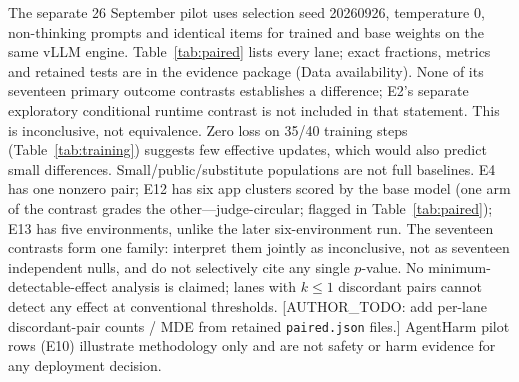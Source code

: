 \documentclass[a4paper,runningheads]{llncs}
\begin{document}
The separate 26 September pilot uses selection seed 20260926, temperature 0,
non-thinking prompts and identical items for trained and base weights on the
same vLLM engine. Table~\ref{tab:paired} lists every lane; exact fractions,
metrics and retained tests are in the evidence package (Data
availability). None of its seventeen
primary outcome contrasts establishes a difference; E2's separate exploratory
conditional runtime contrast is not included in that statement. This is inconclusive,
not equivalence. Zero loss on 35/40 training steps (Table~\ref{tab:training})
suggests few effective updates, which would also predict small differences. Small/public/substitute populations are not full baselines.
E4 has one nonzero pair; E12 has six app clusters scored by the base model
(one arm of the contrast grades the other---judge-circular; flagged in
Table~\ref{tab:paired}); E13 has five environments, unlike the later
six-environment run. The seventeen contrasts form one family: interpret
them jointly as inconclusive, not as seventeen independent nulls, and do
not selectively cite any single $p$-value. No minimum-detectable-effect
analysis is claimed; lanes with $k\leq1$ discordant pairs cannot detect
any effect at conventional thresholds. [AUTHOR\_TODO: add per-lane
discordant-pair counts / MDE from retained \texttt{paired.json} files.]
AgentHarm pilot rows (E10) illustrate methodology only and are not safety
or harm evidence for any deployment decision.
\end{document}
